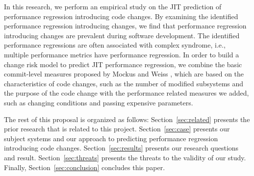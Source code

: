 In this research, we perform an empirical study on the JIT prediction of performance regression introducing code changes. 
By examining the identified performance regression introducing changes, we find that performance regression introducing changes are prevalent during software development. The identified performance regressions are often associated with complex syndrome, i.e., multiple performance metrics have performance regression. In order to build a change risk model to predict JIT performance regression, we combine the basic commit-level measures proposed by Mockus and Weiss \cite{mockus2000predicting}, which are based on the characteristics of code changes, such as the number of modified subsystems and the purpose of the code change with the performance related measures we added, such as changing conditions and passing expensive parameters.



The rest of this proposal is organized as follows: Section~\ref{sec:related} presents the prior research that is related to this project. Section~\ref{sec:case} presents our subject systems and our approach to predicting performance regression introducing code changes. Section~\ref{sec:results} presents our research questions and result. Section~\ref{sec:threats} presents the threats to the validity of our study. Finally, Section~\ref{sec:conclusion} concludes this paper.

